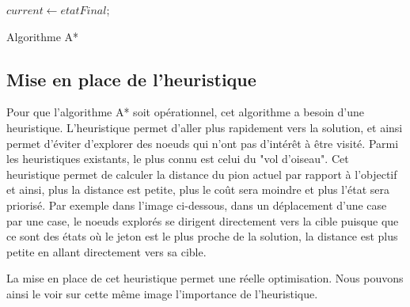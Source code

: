 \documentclass[a4paper, 12pt]{article}
\begin{document}
{\begin{algorithm}[H]
    	        $current \gets etatFinal$;
    
                  \caption{\sc Algorithme A*}
            \end{algorithm}%
            }
            
    \subsection{Mise en place de l'heuristique}
    
        Pour que l'algorithme A* soit opérationnel, cet algorithme a besoin d'une heuristique. L'heuristique permet d'aller plus rapidement vers la solution, et ainsi permet d'éviter d'explorer des noeuds qui n'ont pas d'intérêt à être visité.
        Parmi les heuristiques existants, le plus connu est celui du "vol d'oiseau". Cet heuristique permet de calculer la distance du pion actuel par rapport à l'objectif et ainsi, plus la distance est petite, plus le coût sera moindre et plus l'état sera priorisé. Par exemple dans l'image ci-dessous, dans un déplacement d'une case par une case, le noeuds explorés se dirigent directement vers la cible puisque que ce sont des états où le jeton est le plus proche de la solution, la distance est plus petite en allant directement vers sa cible.
        
    
        La mise en place de cet heuristique permet une réelle optimisation. Nous pouvons ainsi le voir sur cette même image l'importance de l'heuristique.
        
\end{document}
